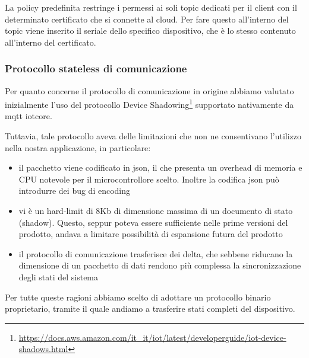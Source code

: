 \documentclass[12pt,a4paper,twoside,titlepage]{book}
\begin{document}
La policy predefinita restringe i permessi ai soli \gls{topic} dedicati per il client con il determinato certificato
che si connette al cloud. Per fare questo all'interno del \gls{topic} viene inserito il seriale dello specifico
dispositivo, che è lo stesso contenuto all'interno del certificato.

\subsubsection{Protocollo stateless di comunicazione}

Per quanto concerne il protocollo di comunicazione in origine abbiamo valutato inizialmente
l'uso del protocollo Device Shadowing\footnote{\url{https://docs.aws.amazon.com/it\_it/iot/latest/developerguide/iot-device-shadows.html}}
supportato nativamente da \Gls{mqtt} \Gls{iotcore}.

Tuttavia, tale protocollo aveva delle limitazioni che non ne consentivano l'utilizzo nella nostra
applicazione, in particolare:

\begin{itemize}
    \item il pacchetto viene codificato in \acrshort{json}, il che presenta un overhead di memoria
        e CPU notevole per il microcontrollore scelto. Inoltre la codifica \acrshort{json} può
        introdurre dei bug di encoding
    \item vi è un hard-limit di 8Kb di dimensione massima di un documento di stato (shadow).
        Questo, seppur poteva essere sufficiente nelle prime versioni del prodotto, andava
        a limitare possibilità di espansione futura del prodotto
    \item il protocollo di comunicazione trasferisce dei delta, che sebbene riducano la
        dimensione di un pacchetto di dati rendono più complessa la sincronizzazione degli
        stati del sistema
\end{itemize}

Per tutte queste ragioni abbiamo scelto di adottare un protocollo binario proprietario,
tramite il quale andiamo a trasferire stati completi del dispositivo.
\end{document}
